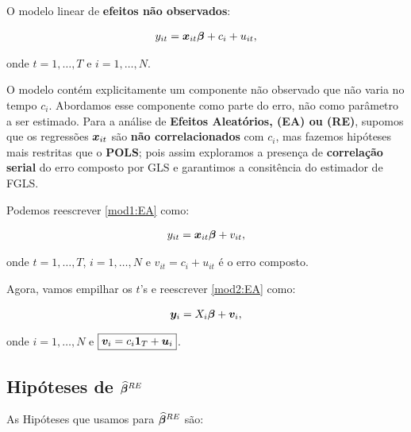 \documentclass[11pt, oneside, a4paper, article]{article}
\numberwithin{equation}{section}
\begin{document}
O modelo linear de \textbf{efeitos não observados}:

\vspace{-1 em}
\begin{align} \label{mod1:EA}
	y_{it} = \boldsymbol{x}_{it} \boldsymbol{\beta} + c_{i} + u_{it},
\end{align}

\noindent
onde
$t = 1, \dots, T$ e $i = 1, \dots, N$.

O modelo contém explicitamente um componente não observado que não varia no tempo $c_{i}$.
Abordamos esse componente como parte do erro, não como parâmetro a ser estimado.
Para a análise de \textbf{Efeitos Aleatórios, (EA) ou (RE)}, supomos que os regressões $\boldsymbol{x}_{it}$ são \textbf{não correlacionados} com $c_{i}$, mas fazemos hipóteses mais restritas que o \textbf{POLS}; pois assim exploramos a presença de \textbf{correlação serial} do erro composto por GLS e garantimos a consitência do estimador de FGLS.

Podemos reescrever \eqref{mod1:EA} como:

\vspace{-1 em}
\begin{align} \label{mod2:EA}
	y_{it} = \boldsymbol{x}_{it} \boldsymbol{\beta} + v_{it},
\end{align}

\noindent
onde
$t = 1, \dots, T$, $i = 1, \dots, N$ e $\boxed{v_{it} = c_{i} + u_{it}}$ é o erro composto.

Agora, vamos empilhar os $t$'s e reescrever \eqref{mod2:EA} como:

\vspace{-1 em}
\begin{align} \label{mod3:EA}
	\boldsymbol{y}_{i} = X_{i} \boldsymbol{\beta} + \boldsymbol{v}_{i},
\end{align}

\noindent
onde
$i = 1, \dots, N$ e $\boxed{\boldsymbol{v}_{i} = c_{i} \boldsymbol{1}_{T} + \boldsymbol{u}_{i}}$.

\subsection*{Hipóteses de $\boldsymbol{\widehat{\beta}}^{RE}$}

As Hipóteses que usamos para $\boldsymbol{\widehat{\beta}}^{RE}$ são:
\end{document}

